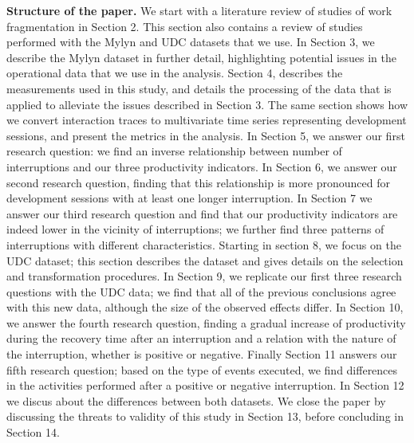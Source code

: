 \documentclass[times]{smrauth}
\begin{document}
\textbf{Structure of the paper.} We start with a literature review of studies of work fragmentation in Section 2. This section also contains a review of studies performed with the Mylyn and UDC datasets that we use. In Section 3, we describe the Mylyn dataset in further detail, highlighting potential issues in the operational data that we use in the analysis. Section 4, describes the measurements used in this study, and details the processing of the data that is applied to alleviate the issues described in Section 3. The same section shows how we convert interaction traces to multivariate time series representing development sessions, and present the metrics in the analysis. In Section 5, we answer our first research question: we find an inverse relationship between number of interruptions and our three productivity indicators. In Section 6, we answer our second research question, finding that this relationship is more pronounced for development sessions with at least one longer interruption. In Section 7 we answer our third research question and find that our productivity indicators are indeed lower in the vicinity of interruptions; we further find three patterns of interruptions with different characteristics. Starting in section 8, we focus on the UDC dataset; this section describes the dataset and gives details on the selection and transformation procedures. In Section 9, we replicate our first three research questions with the UDC data; we find that all of the previous conclusions agree with this new data, although the size of the observed effects differ. In Section 10, we answer the fourth research question, finding a gradual increase of productivity during the recovery time after an interruption and a relation with the nature of the interruption, whether is positive or negative. Finally Section 11 answers our fifth research question; based on the type of events executed, we find differences in the activities performed after a positive or negative interruption. In Section 12 we discus about the differences between both datasets. We close the paper by discussing the threats to validity of this study in Section 13, before concluding in Section 14.

\end{document}
